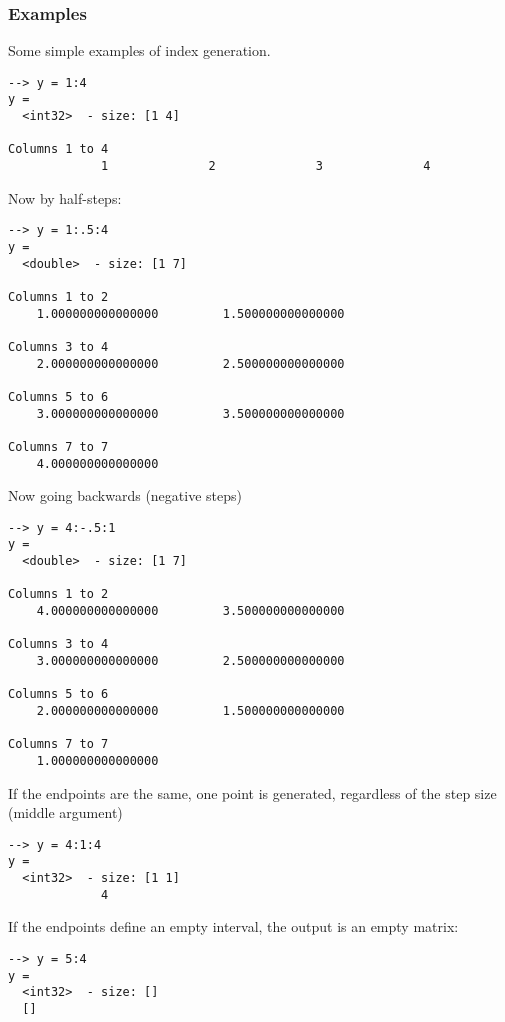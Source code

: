 \subsubsection{Examples}
Some simple examples of index generation.
\begin{verbatim}
--> y = 1:4
y =
  <int32>  - size: [1 4]
  
Columns 1 to 4
             1              2              3              4
\end{verbatim}
Now by half-steps:
\begin{verbatim}
--> y = 1:.5:4
y =
  <double>  - size: [1 7]
  
Columns 1 to 2
    1.000000000000000         1.500000000000000
  
Columns 3 to 4
    2.000000000000000         2.500000000000000
  
Columns 5 to 6
    3.000000000000000         3.500000000000000
  
Columns 7 to 7
    4.000000000000000
\end{verbatim}
Now going backwards (negative steps)
\begin{verbatim}
--> y = 4:-.5:1
y =
  <double>  - size: [1 7]
  
Columns 1 to 2
    4.000000000000000         3.500000000000000
  
Columns 3 to 4
    3.000000000000000         2.500000000000000
  
Columns 5 to 6
    2.000000000000000         1.500000000000000
  
Columns 7 to 7
    1.000000000000000
\end{verbatim}
If the endpoints are the same, one point is generated, regardless of the step size (middle argument)
\begin{verbatim}
--> y = 4:1:4
y =
  <int32>  - size: [1 1]
             4
\end{verbatim}
If the endpoints define an empty interval, the output is an empty matrix:
\begin{verbatim}
--> y = 5:4
y =
  <int32>  - size: []
  []
\end{verbatim}
